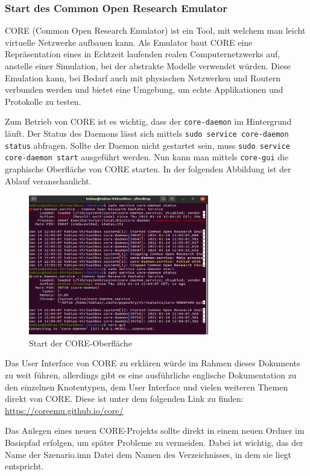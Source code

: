 \documentclass{article}
\begin{document}
\subsubsection{Start des Common Open Research Emulator}
CORE (Common Open Research Emulator) ist ein Tool, mit welchem man leicht virtuelle Netzwerke aufbauen kann. Als Emulator baut CORE eine Repräsentation eines in Echtzeit laufenden realen Computernetzwerks auf, anstelle einer Simulation, bei der abstrakte Modelle verwendet würden. Diese Emulation kann, bei Bedarf auch mit physischen Netzwerken und Routern verbunden werden und bietet eine Umgebung, um echte Applikationen und Protokolle zu testen.\cite{core-docs} \par
Zum Betrieb von CORE ist es wichtig, dass der \texttt{core-daemon} im Hintergrund läuft. Der Status des Daemons lässt sich mittels \texttt{sudo service core-daemon status} abfragen. Sollte der Daemon nicht gestartet sein, muss \texttt{sudo service core-daemon start} ausgeführt werden. Nun kann man mittels \texttt{core-gui} die graphische Oberfläche von CORE starten. In der folgenden Abbildung ist der Ablauf veranschaulicht.\par
\begin{figure}[ht]
\centering
\includegraphics[width=0.7\textwidth]{core-start}
\caption{Start der CORE-Oberfläche}
\end{figure}
Das User Interface von CORE zu erklären würde im Rahmen dieses Dokuments zu weit führen, allerdings gibt es eine ausführliche englische Dokumentation zu den einzelnen Knotentypen, dem User Interface und vielen weiteren Themen direkt von CORE. Diese ist unter dem folgenden Link zu finden: \url{https://coreemu.github.io/core/}\par
Das Anlegen eines neuen CORE-Projekts sollte direkt in einem neuen Ordner im Basispfad erfolgen, um später Probleme zu vermeiden. Dabei ist wichtig, das der Name der Szenario.imn Datei dem Namen des Verzeichnisses, in dem sie liegt entspricht.\par
\end{document}
